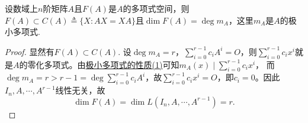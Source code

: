 \documentclass[../../main.tex]{subfiles}
\begin{document}
\begin{proposition}\label{proposition:矩阵多项式空间的维数等于极小多项式的次数}
设数域上$n$阶矩阵$A$且$F(A)$是$A$的多项式空间，则$F(A)\subset C(A)\triangleq\{X: AX = XA\}$且$\dim F(A)=\deg m_A$，这里$m_A$是$A$的极小多项式.
\end{proposition}
\begin{proof}
显然有$F(A)\subset C(A)$.
设\(\deg m_A = r\)，\(\sum_{i = 0}^{r - 1} c_i A^i = O\)，则\(\sum_{i = 0}^{r - 1} c_i x^i\)就是\(A\)的零化多项式。由\hyperref[proposition:极小多项式的性质]{极小多项式的性质(1)}可知\(m_A(x) \mid \sum_{i = 0}^{r - 1} c_i x^i\)，  
而\(\deg m_A = r > r - 1 = \deg \sum_{i = 0}^{r - 1} c_i A^i\)，故\(\sum_{i = 0}^{r - 1} c_i x^i = O\)，即\(c_i = 0\)。因此\(I_n, A, \cdots, A^{r - 1}\)线性无关，故  
\[
\dim F(A) = \dim L(I_n, A, \cdots, A^{r - 1}) = r.
\]

\end{proof}
\end{document}
